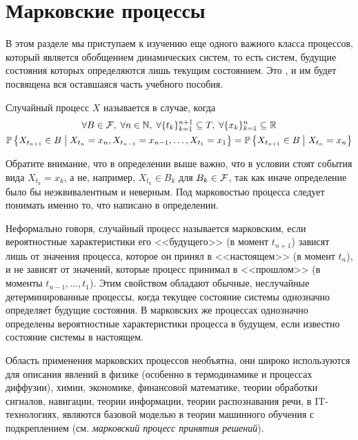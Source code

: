 \section{Марковские процессы} \label{section:markov}

В этом разделе мы приступаем к изучению еще одного важного класса процессов,
который является обобщением динамических систем,
то есть систем, будущие состояния которых определяются лишь текущим состоянием.
Это , и им будет посвящена вся оставшаяся часть учебного пособия.

\begin{definition}
    \label{definition:markov:markov_process}
    Случайный процесс $ X $ называется  в случае, когда
    \begin{multline*}
        \forall B \in \mathcal{F}, \; \forall n \in \mathbb{N}, \; \forall \{ t_k \}_{k=1}^{n+1} \subseteq T, \; \forall \{ x_k \}_{k=1}^n \subseteq \mathbb{R} \\
        \mathbb{P} \left\{ X_{t_{n+1}} \in B \;\middle|\; X_{t_n} = x_n, X_{t_{n-1}} = x_{n-1}, \ldots, X_{t_1} = x_1 \right\} =
        \mathbb{P} \left\{ X_{t_{n+1}} \in B \;\middle|\; X_{t_n} = x_n \right\}
    \end{multline*}
\end{definition}

Обратите внимание, что в определении выше важно,
что в условии стоят события вида $ X_{t_k} = x_k $,
а не, например, $ X_{t_k} \in B_k $ для $ B_k \in \mathcal{F} $,
так как иначе определение было бы неэквивалентным и неверным.
Под марковостью процесса следует понимать именно то, что написано в определении.

Неформально говоря, случайный процесс называется марковским,
если вероятностные характеристики его <<будущего>> (в момент $ t_{n+1} $)
зависят лишь от значения процесса, которое он принял в <<настоящем>> (в момент $ t_n $),
и не зависят от значений, которые процесс принимал в <<прошлом>> (в моменты $ t_{n-1}, \ldots, t_1 $).
Этим свойством обладают обычные, неслучайные детерминированные процессы,
когда текущее состояние системы однозначно определяет будущие состояния.
В марковских же процессах однозначно определены вероятностные характеристики процесса в будущем,
если известно состояние системы в настоящем.

Область применения марковских процессов необъятна,
они широко используются для описания явлений в физике
(особенно в термодинамике и процессах диффузии), химии, экономике,
финансовой математике, теории обработки сигналов, навигации, теории информации,
теории распознавания речи, в IT-технологиях,
являются базовой моделью в теории машинного обучения с подкреплением
(см. \emph{марковский процесс принятия решений}).

